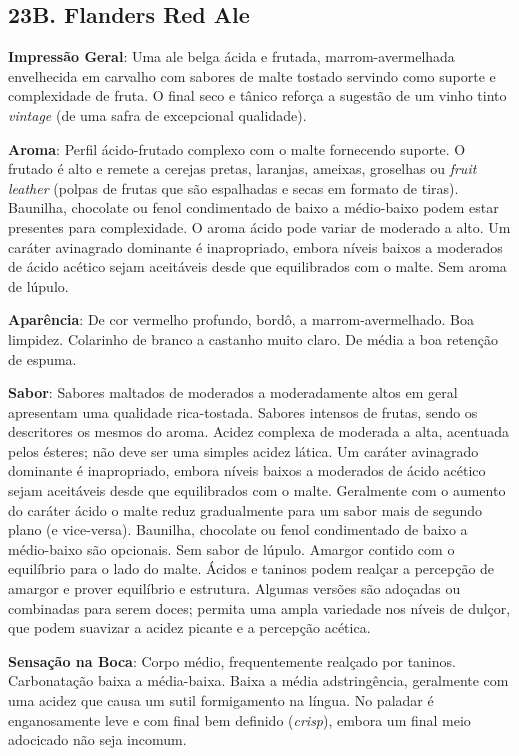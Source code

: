 \subsection*{23B. Flanders Red Ale}
\textbf{Impressão Geral}: Uma ale belga ácida e frutada, marrom-avermelhada envelhecida em carvalho com sabores de malte tostado servindo como suporte e complexidade de fruta. O final seco e tânico reforça a sugestão de um vinho tinto \textit{vintage} (de uma safra de excepcional qualidade).

\textbf{Aroma}: Perfil ácido-frutado complexo com o malte fornecendo suporte. O frutado é alto e remete a cerejas pretas, laranjas, ameixas, groselhas ou \textit{fruit leather} (polpas de frutas que são espalhadas e secas em formato de tiras). Baunilha, chocolate ou fenol condimentado de baixo a médio-baixo podem estar presentes para complexidade. O aroma ácido pode variar de moderado a alto. Um caráter avinagrado dominante é inapropriado, embora níveis baixos a moderados de ácido acético sejam aceitáveis desde que equilibrados com o malte. Sem aroma de lúpulo.

\textbf{Aparência}: De cor vermelho profundo, bordô, a marrom-avermelhado. Boa limpidez. Colarinho de branco a castanho muito claro. De média a boa retenção de espuma.

\textbf{Sabor}: Sabores maltados de moderados a moderadamente altos em geral apresentam uma qualidade rica-tostada. Sabores intensos de frutas, sendo os descritores os mesmos do aroma. Acidez complexa de moderada a alta, acentuada pelos ésteres; não deve ser uma simples acidez lática. Um caráter avinagrado dominante é inapropriado, embora níveis baixos a moderados de ácido acético sejam aceitáveis desde que equilibrados com o malte. Geralmente com o aumento do caráter ácido o malte reduz gradualmente para um sabor mais de segundo plano (e vice-versa). Baunilha, chocolate ou fenol condimentado de baixo a médio-baixo são opcionais. Sem sabor de lúpulo. Amargor contido com o equilíbrio para o lado do malte. Ácidos e taninos podem realçar a percepção de amargor e prover equilíbrio e estrutura. Algumas versões são adoçadas ou combinadas para serem doces; permita uma ampla variedade nos níveis de dulçor, que podem suavizar a acidez picante e a percepção acética.

\textbf{Sensação na Boca}: Corpo médio, frequentemente realçado por taninos. Carbonatação baixa a média-baixa. Baixa a média adstringência, geralmente com uma acidez que causa um sutil formigamento na língua. No paladar é enganosamente leve e com final bem definido (\textit{crisp}), embora um final meio adocicado não seja incomum.


